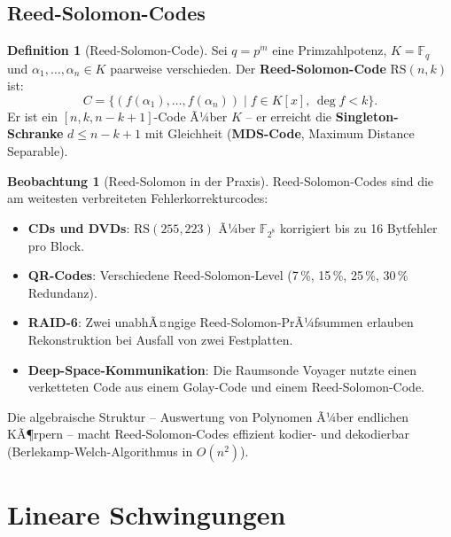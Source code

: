 ﻿\documentclass[a4paper,12pt]{report}
\theoremstyle{definition}
\newtheorem{definition}{Definition}
\newtheorem{beobachtung}{Beobachtung}
\begin{document}

\section{Reed-Solomon-Codes}

\begin{definition}[Reed-Solomon-Code]
    Sei $q = p^m$ eine Primzahlpotenz, $K = \mathbb{F}_q$ und
    $\alpha_1, \ldots, \alpha_n \in K$ paarweise verschieden.
    Der \textbf{Reed-Solomon-Code} $\mathrm{RS}(n, k)$ ist:
    \[
        C = \{(f(\alpha_1), \ldots, f(\alpha_n)) \mid f \in K[x],\,\deg f < k\}.
    \]
    Er ist ein $[n, k, n-k+1]$-Code Ã¼ber $K$ -- er erreicht die
    \textbf{Singleton-Schranke} $d \leq n - k + 1$ mit Gleichheit
    (\textbf{MDS-Code}, Maximum Distance Separable).
\end{definition}

\begin{beobachtung}[Reed-Solomon in der Praxis]
    Reed-Solomon-Codes sind die am weitesten verbreiteten Fehlerkorrekturcodes:
    \begin{itemize}
        \item[-] \textbf{CDs und DVDs}: $\mathrm{RS}(255, 223)$ Ã¼ber
              $\mathbb{F}_{2^8}$ korrigiert bis zu 16 Bytfehler pro Block.
        \item[-] \textbf{QR-Codes}: Verschiedene Reed-Solomon-Level
              (7\,\%, 15\,\%, 25\,\%, 30\,\% Redundanz).
        \item[-] \textbf{RAID-6}: Zwei unabhÃ¤ngige Reed-Solomon-PrÃ¼fsummen
              erlauben Rekonstruktion bei Ausfall von zwei Festplatten.
        \item[-] \textbf{Deep-Space-Kommunikation}: Die Raumsonde
              Voyager nutzte einen verketteten Code aus einem
              Golay-Code und einem Reed-Solomon-Code.
    \end{itemize}
    Die algebraische Struktur -- Auswertung von Polynomen Ã¼ber
    endlichen KÃ¶rpern -- macht Reed-Solomon-Codes effizient
    kodier- und dekodierbar (Berlekamp-Welch-Algorithmus in $O(n^2)$).
\end{beobachtung}

\chapter{Lineare Schwingungen}
\end{document}

